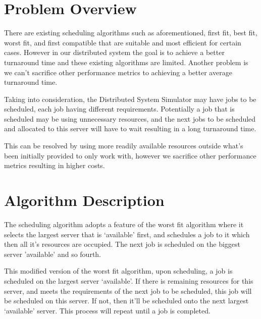 \documentclass[a4paper]{article} %
\begin{document}

\section{Problem Overview}
\label{sec:section2}
There are existing scheduling algorithms such as aforementioned, first fit, best fit, worst fit, and first compatible that are suitable and most efficient for certain cases. However in our distributed system the goal is to achieve a better turnaround time and these existing algorithms are limited. Another problem is we can’t sacrifice other performance metrics to achieving a better average turnaround time.
\bigskip

Taking into consideration, the Distributed System Simulator may have jobs to be scheduled, each job having different requirements. Potentially a job that is scheduled may be using unnecessary resources, and the next jobs to be scheduled and allocated to this server will have to wait resulting in a long turnaround time.
\bigskip

This can be resolved by using more readily available resources outside what’s been initially provided to only work with, however we sacrifice other performance metrics resulting in higher costs.


\break
\section{Algorithm Description}
\label{sec:section3}
The scheduling algorithm adopts a feature of the worst fit algorithm where it selects the largest server that is ‘available’ first, and schedules a job to it which then all it's resources are occupied. The next job is scheduled on the biggest server 'available' and so fourth.
\medskip

This modified version of the worst fit algorithm, upon scheduling, a job is scheduled on the largest server ‘available’. If there is remaining resources for this server, and meets the requirements of the next job to be scheduled, this job will be scheduled on this server. If not, then it’ll be scheduled onto the next largest ‘available’ server. This process will repeat until a job is completed.
\medskip
\end{document}

